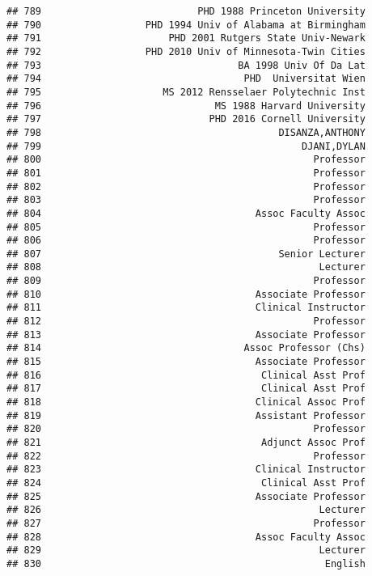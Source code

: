 \documentclass[
]{article}
\begin{document}
\begin{verbatim}
## 789                           PHD 1988 Princeton University
## 790                  PHD 1994 Univ of Alabama at Birmingham
## 791                      PHD 2001 Rutgers State Univ-Newark
## 792                  PHD 2010 Univ of Minnesota-Twin Cities
## 793                                  BA 1998 Univ Of Da Lat
## 794                                   PHD  Universitat Wien
## 795                     MS 2012 Rensselaer Polytechnic Inst
## 796                              MS 1988 Harvard University
## 797                             PHD 2016 Cornell University
## 798                                         DISANZA,ANTHONY
## 799                                             DJANI,DYLAN
## 800                                               Professor
## 801                                               Professor
## 802                                               Professor
## 803                                               Professor
## 804                                     Assoc Faculty Assoc
## 805                                               Professor
## 806                                               Professor
## 807                                         Senior Lecturer
## 808                                                Lecturer
## 809                                               Professor
## 810                                     Associate Professor
## 811                                     Clinical Instructor
## 812                                               Professor
## 813                                     Associate Professor
## 814                                   Assoc Professor (Chs)
## 815                                     Associate Professor
## 816                                      Clinical Asst Prof
## 817                                      Clinical Asst Prof
## 818                                     Clinical Assoc Prof
## 819                                     Assistant Professor
## 820                                               Professor
## 821                                      Adjunct Assoc Prof
## 822                                               Professor
## 823                                     Clinical Instructor
## 824                                      Clinical Asst Prof
## 825                                     Associate Professor
## 826                                                Lecturer
## 827                                               Professor
## 828                                     Assoc Faculty Assoc
## 829                                                Lecturer
## 830                                                 English

\end{verbatim}
\end{document}
